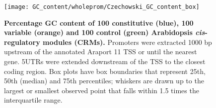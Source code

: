 \documentclass[../main.tex]{subfiles}
\begin{document}
\begin{figure}[hbt!]
	\begin{center}
		\capstart
		\texttt{[image: GC\_content/wholeprom/Czechowski\_GC\_content\_box]}
		\caption{
			\textbf{Percentage GC content of 100 constitutive (blue), 100 variable (orange) and 100 control (green) Arabidopsis \textit{cis}\hyp{}regulatory modules (CRMs).}
			Promoters were extracted 1000 bp upstream of the annotated Araport 11 \autocite{chengAraport11CompleteReannotation2017} TSS or until the nearest gene.
			5UTRs were extended downstream of the TSS to the closest coding region.  Box plots have box boundaries that represent 25th, 50th (median) and 75th percentiles; whiskers are drawn up to the largest or smallest observed point that falls within 1.5 times the interquartile range.
			\label{fig:gc-content-wholeprom}
		}
	\end{center}
\end{figure}
\end{document}
